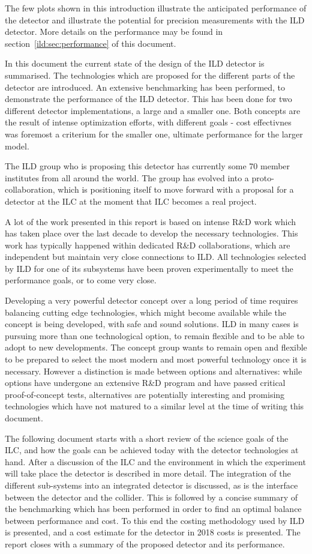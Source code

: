 The few plots shown in this introduction illustrate the anticipated performance of the detector and illustrate the potential for precision measurements with the ILD detector. More details on the performance may be found in section~\ref{ild:sec:performance} of this document. 

In this document the current state of the design of the ILD detector is summarised. The technologies which are proposed for the different parts of the detector are introduced. An extensive benchmarking has been performed, to demonstrate the performance of the ILD detector. This has been done for two different detector implementations, a large and a smaller one. Both concepts are the result of intense optimization efforts, with different goals - cost effectivnes was foremost a criterium for the smaller one, ultimate performance for the larger model. 

The ILD group who is proposing this detector has currently some 70 member institutes from all around the world. The group has evolved into a proto-collaboration, which is positioning itself to move forward with a proposal for a detector at the ILC at the moment that ILC becomes a real project. 

A lot of the work presented in this report is based on intense R\&D work which has taken place over the last decade to develop the necessary technologies. 
This work has typically happened within dedicated R\&D collaborations, which are independent but maintain very close connections to ILD. All technologies selected by ILD for one of its subsystems have been proven experimentally to meet the performance goals, or to come very close. 

Developing a very powerful detector concept over a long period of time requires balancing cutting edge technologies, which might become available while the concept is being developed, with safe and sound solutions. ILD in many cases is pursuing more than one technological option, to remain flexible and to be able to adopt to new developments. The concept group  wants to remain open and flexible to be prepared to select the most modern and most powerful technology once it is necessary. 
However a distinction is made between options and alternatives: while options have undergone an extensive R\&D program and have passed critical proof-of-concept tests, alternatives are potentially interesting and promising technologies which have not matured to a similar level at the time of writing this document. 

The following document starts with a short review of the science goals of the ILC, and how the goals can be achieved today with the detector technologies at hand. After a discussion of the ILC and the environment in which the experiment will take place the detector is described in more detail. The integration of the different sub-systems into an integrated detector is discussed, as is the interface between the detector and the collider. This is followed by a concise summary of the benchmarking which has been performed in order to find an optimal balance between performance and cost. To this end the costing methodology used by ILD is presented, and a cost estimate for the detector in 2018 costs is presented. The report closes with a summary of the proposed detector and its performance. 
